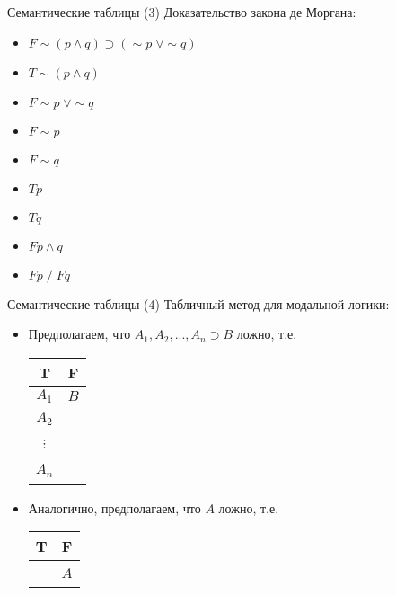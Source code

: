 \documentclass{beamer}
\begin{document}
\begin{frame}{Семантические таблицы (3)}
Доказательство закона де Моргана:\\
\bigskip
\begin{itemize}
  \item $F \! \sim (p \wedge q) \supset (\sim p \; \vee \sim q)$
  \item $T \! \sim (p \wedge q)$
  \item $F \! \sim p \; \vee \sim q$
  \item $F \! \sim p$
  \item $F \! \sim q$
  \item $T \! p$
  \item $T \! q$
  \item $F \! p \wedge q$
  \item $F \! p \; / \; F \! q$
\end{itemize}
\end{frame}

\begin{frame}{Семантические таблицы (4)}
Табличный метод для модальной логики:\\
\bigskip
\begin{itemize}
  \item Предполагаем, что $A_1, A_2, ..., A_n \supset B$ ложно, т.е.
    \begin{table}
      \begin{tabular*}{1.5cm}{c|c}
        T   & F \\ \hline
        $A_1$ & $B$ \\
        $A_2$ & ~ \\
        $\vdots$ & ~ \\
        $A_n$ & ~ \\
      \end{tabular*}
    \end{table}
  \item Аналогично, предполагаем, что $A$ ложно, т.е. 
    \begin{table}
      \begin{tabular*}{1.3cm}{c|c}
        T   & F \\ \hline
        ~ & $A$ \\
      \end{tabular*}
    \end{table}
\end{itemize}
\end{frame}
\end{document}
